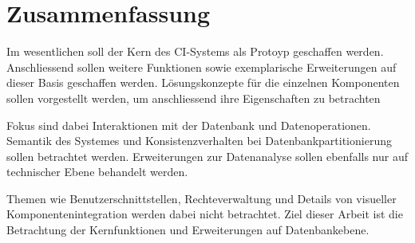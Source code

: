 \section{Zusammenfassung}


Im wesentlichen soll der Kern des CI-Systems als Protoyp geschaffen werden.
Anschliessend sollen weitere Funktionen sowie exemplarische Erweiterungen
auf dieser Basis geschaffen werden.
L\"osungskonzepte f\"ur die einzelnen Komponenten sollen vorgestellt werden,
um anschliessend ihre Eigenschaften zu betrachten

Fokus sind dabei Interaktionen mit der Datenbank und Datenoperationen.
Semantik des Systemes und Konsistenzverhalten bei Datenbankpartitionierung
sollen betrachtet werden. Erweiterungen zur Datenanalyse sollen ebenfalls nur auf technischer Ebene behandelt werden.

Themen wie Benutzerschnittstellen, Rechteverwaltung und Details
von visueller Komponentenintegration werden dabei nicht betrachtet.
Ziel dieser Arbeit ist die Betrachtung der Kernfunktionen und Erweiterungen auf Datenbankebene.

